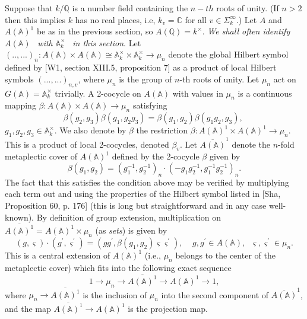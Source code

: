Suppose that $k/{\mathbb{Q}}$ is a number field containing the $n-th$ roots of
unity. (If $n>2$ then this implies $k$ has no real places, i.e, $k_v=\mathbb{C}$
for all $v\in \Sigma _k^\infty $.)
Let $A$ and $A({\mathbb{A}})^1$ be as in the previous section,
so $A({\mathbb{Q}})=k^\times$.
\emph{We shall often identify }
$A({\mathbb{A}})$
\emph{\ with }
${\mathbb{A}}_k^{\times }$
\emph{\ in this section}. Let
$(..,...)_n:A({\mathbb{A}})\times A({\mathbb{A}})
\cong {\mathbb{A}}_k^{\times }\times {\mathbb{A}}_k^{\times}\rightarrow \mu _n$
denote the global Hilbert symbol defined by
[W1, section XIII.5, proposition 7] as a product of local
Hilbert symbols $(...,...)_{n,v}$, where
$\mu _n$ is the group of $n$-th roots of unity. Let $\mu _n$ act on 
$G({\mathbb{A}})={\mathbb{A}}_k^{\times }$ trivially.
A 2-cocycle on $A({\mathbb{A}})$ with
values in $\mu _n$ is a continuous mapping
$\beta :A({\mathbb{A}})\times A({\mathbb{A}})\rightarrow \mu _n$ satisfying 
\begin{equation}
\beta (g_2,g_3)\beta (g_1,g_2g_3)=\beta (g_1,g_2)\beta (g_1g_2,g_3),\;
\end{equation}
$g_1,g_2,g_3\in {\mathbb{A}}_k^{\times }$. We also denote by $\beta $ the
restriction
$\beta :A({\mathbb{A}})^1\times A({\mathbb{A}})^1\rightarrow \mu _n$. This
is a product of local 2-cocycles, denoted $\beta _v$. Let
$\overline{A(\mathbb{A})}^1$ denote the $n$-fold
metaplectic cover of $A({\mathbb{A}})^1$
defined by the 2-cocycle $\beta $ given by 
\begin{equation}
\beta (g_1,g_2)=(g_1^{-1},g_2^{-1})_n\cdot (-g_1g_2^{-1},g_1^{-1}g_2^{-1})_n.
\end{equation}
The fact that this satisfies the condition above may be verified by
multiplying each term out and using the properties of the Hilbert symbol
listed in [Sha, Proposition 60, p. 176] (this is long but
straightforward and in any case well-known).
By definition of group extension, multiplication
on $\overline{A({\mathbb{A}})^1}=A({\mathbb{A}})^1\times \mu _n$
(as \emph{sets}) is given by 
\begin{equation}
(g,\varsigma )\cdot (g^{\prime },\varsigma ^{\prime })=(gg^{\prime },\beta
(g_1,g_2)\varsigma \varsigma ^{\prime }),
\;\;\;\;g,g^{\prime }\in A({\mathbb{A}}),
\;\;\varsigma ,\varsigma ^{\prime }\in \mu _n.
\end{equation}
This is a central extension of $A({\mathbb{A}})^1$ (i.e.,
$\mu _n$ belongs to the
center of the metaplectic cover) which fits into the following exact
sequence 
\[
1\rightarrow \mu _n\rightarrow \overline{A({\mathbb{A}})^1}
\rightarrow A({\mathbb{A}})^1\rightarrow 1,
\]
where $\mu _n\rightarrow \overline{A({\mathbb{A}})^1}$ is the
inclusion of $\mu _n$ into the second component of
$\overline{A({\mathbb{A}})}^1$, and the map
$\overline{A({\mathbb{A}})^1}\rightarrow A({\mathbb{A}})^1$ is the
projection map.

